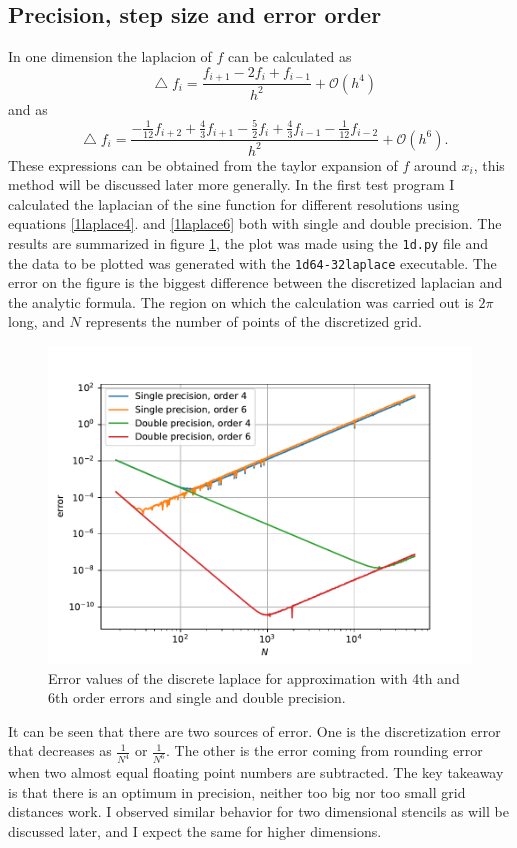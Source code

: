 \documentclass[pdftex,12pt,a4paper]{article}
\newcommand*\Laplace{\mathop{}\!\mathbin\bigtriangleup}
\begin{document}
	\subsection{Precision, step size and error order}
		In one dimension the laplacion of $f$ can be calculated as
		\begin{equation}
			\Laplace f_i = \frac{f_{i+1} - 2f_i + f_{i-1}}{h^2} + \mathcal{O}(h^4)
			\label{1laplace4}
		\end{equation}
		and as
		\begin{equation}
			\Laplace f_i = \frac{-\frac{1}{12}f_{i+2} + \frac{4}{3}f_{i+1} - \frac{5}{2}f_i + \frac{4}{3}f_{i-1} - \frac{1}{12}f_{i-2}}{h^2} + \mathcal{O}(h^6).
			\label{1laplace6}
		\end{equation}
		These expressions can be obtained from the taylor expansion of $f$ around $x_i$, this method will be discussed later more generally. In the first test program I calculated the laplacian of the sine function for different resolutions using equations \ref{1laplace4}. and \ref{1laplace6} both with single and double precision. The results are summarized in figure \ref{1dpdf}, the plot was made using the \texttt{1d.py} file and the data to be plotted was generated with the \texttt{1d64-32laplace} executable. The error on the figure is the biggest difference between the discretized laplacian and the analytic formula. The region on which the calculation was carried out is $2\pi$ long, and $N$ represents the number of points of the discretized grid.
		\begin{figure}[H]
			\centering
			\includegraphics[scale=1]{./figs/1d.pdf}
			\caption{Error values of the discrete laplace for approximation with 4th and 6th order errors and single and double precision. }
			\label{1dpdf}
		\end{figure}
		It can be seen that there are two sources of error. One is the discretization error that decreases as $\frac{1}{N^4}$ or $\frac{1}{N^6}$. The other is the error coming from rounding error when two almost equal floating point numbers are subtracted. The key takeaway is that there is an optimum in precision, neither too big nor too small grid distances work. I observed similar behavior for two dimensional stencils as will be discussed later, and I expect the same for higher dimensions.
\end{document}

